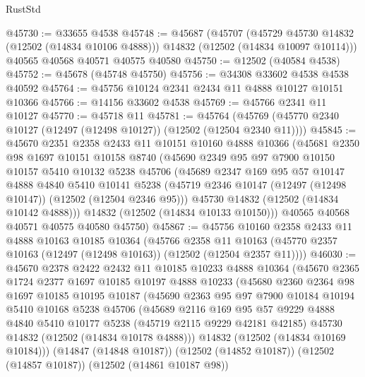 \begin{lexlean}{RustStd}
\begin{coremodule}
@45730 := @33655 @4538
@45748 := @45687
    (@45707
      (@45729 @45730 @14832 (@12502 (@14834 @10106 @4888)))
      @14832
      (@12502 (@14834 @10097 @10114)))
    @40565
    @40568
    @40571
    @40575
    @40580
@45750 := @12502 (@40584 @4538)
@45752 := @45678 (@45748 @45750)
@45756 := @34308 @33602 @4538 @4538 @40592
@45764 := @45756 @10124 @2341 @2434 @11 @4888 @10127 @10151 @10366
@45766 := @14156 @33602 @4538
@45769 := @45766 @2341 @11 @10127
@45770 := @45718 @11
@45781 := @45764 (@45769 (@45770 @2340 @10127 (@12497 (@12498 @10127)) (@12502 (@12504 @2340 @11))))
@45845 := @45670
    @2351
    @2358
    @2433
    @11
    @10151
    @10160
    @4888
    @10366
    (@45681
      @2350
      @98
      @1697
      @10151
      @10158
      @8740
      (@45690
        @2349
        @95
        @97
        @7900
        @10150
        @10157
        @5410
        @10132
        @5238
        @45706
        (@45689
          @2347
          @169
          @95
          @57
          @10147
          @4888
          @4840
          @5410
          @10141
          @5238
          (@45719 @2346 @10147 (@12497 (@12498 @10147)) (@12502 (@12504 @2346 @95)))
          @45730
          @14832
          (@12502 (@14834 @10142 @4888)))
        @14832
        (@12502 (@14834 @10133 @10150)))
      @40565
      @40568
      @40571
      @40575
      @40580
      @45750)
@45867 := @45756
    @10160
    @2358
    @2433
    @11
    @4888
    @10163
    @10185
    @10364
    (@45766
      @2358
      @11
      @10163
      (@45770 @2357 @10163 (@12497 (@12498 @10163)) (@12502 (@12504 @2357 @11))))
@46030 := @45670
    @2378
    @2422
    @2432
    @11
    @10185
    @10233
    @4888
    @10364
    (@45670
      @2365
      @1724
      @2377
      @1697
      @10185
      @10197
      @4888
      @10233
      (@45680
        @2360
        @2364
        @98
        @1697
        @10185
        @10195
        @10187
        (@45690
          @2363
          @95
          @97
          @7900
          @10184
          @10194
          @5410
          @10168
          @5238
          @45706
          (@45689
            @2116
            @169
            @95
            @57
            @9229
            @4888
            @4840
            @5410
            @10177
            @5238
            (@45719 @2115 @9229 @42181 @42185)
            @45730
            @14832
            (@12502 (@14834 @10178 @4888)))
          @14832
          (@12502 (@14834 @10169 @10184)))
        (@14847 (@14848 @10187))
        (@12502 (@14852 @10187))
        (@12502 (@14857 @10187))
        (@12502 (@14861 @10187 @98))

\end{coremodule}
\end{lexlean}
